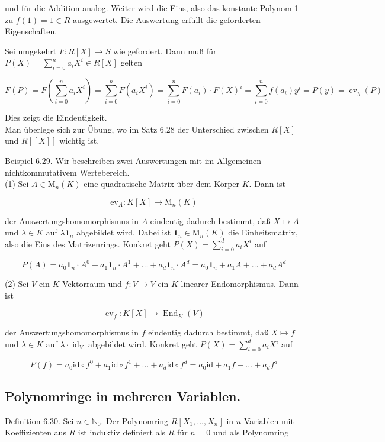\documentclass[10pt, letterpaper]{article}
\begin{document}
und für die Addition analog. Weiter wird die Eins, also das konstante Polynom 1 zu $f(1)=1 \in R$ ausgewertet. Die Auswertung erfüllt die geforderten Eigenschaften.

Sei umgekehrt $F: R[X] \rightarrow S$ wie gefordert. Dann muß für $P(X)=\sum_{i=0}^{n} a_{i} X^{i} \in R[X]$ gelten

$$
F(P)=F\left(\sum_{i=0}^{n} a_{i} X^{i}\right)=\sum_{i=0}^{n} F\left(a_{i} X^{i}\right)=\sum_{i=0}^{n} F\left(a_{i}\right) \cdot F(X)^{i}=\sum_{i=0}^{n} f\left(a_{i}\right) y^{i}=P(y)=\operatorname{ev}_{y}(P)
$$

Dies zeigt die Eindeutigkeit.\\
Man überlege sich zur Übung, wo im Satz 6.28 der Unterschied zwischen $R[X]$ und $R[[X]]$ wichtig ist.

Beispiel 6.29. Wir beschreiben zwei Auswertungen mit im Allgemeinen nichtkommutativem Wertebereich.\\
(1) Sei $A \in \mathrm{M}_{n}(K)$ eine quadratische Matrix über dem Körper $K$. Dann ist

$$
\mathrm{ev}_{A}: K[X] \rightarrow \mathrm{M}_{n}(K)
$$

der Auswertungshomomorphismus in $A$ eindeutig dadurch bestimmt, daß $X \mapsto A$ und $\lambda \in K$ auf $\lambda \mathbf{1}_{n}$ abgebildet wird. Dabei ist $\mathbf{1}_{n} \in \mathrm{M}_{n}(K)$ die Einheitsmatrix, also die Eins des Matrizenrings. Konkret geht $P(X)=\sum_{i=0}^{d} a_{i} X^{i}$ auf

$$
P(A)=a_{0} \mathbf{1}_{n} \cdot A^{0}+a_{1} \mathbf{1}_{n} \cdot A^{1}+\ldots+a_{d} \mathbf{1}_{n} \cdot A^{d}=a_{0} \mathbf{1}_{n}+a_{1} A+\ldots+a_{d} A^{d}
$$

(2) Sei $V$ ein $K$-Vektorraum und $f: V \rightarrow V$ ein $K$-linearer Endomorphismus. Dann ist

$$
\operatorname{ev}_{f}: K[X] \rightarrow \operatorname{End}_{K}(V)
$$

der Auswertungshomomorphismus in $f$ eindeutig dadurch bestimmt, daß $X \mapsto f$ und $\lambda \in K$ auf $\lambda \cdot \operatorname{id}_{V}$ abgebildet wird. Konkret geht $P(X)=\sum_{i=0}^{d} a_{i} X^{i}$ auf

$$
P(f)=a_{0} \mathrm{id} \circ f^{0}+a_{1} \mathrm{id} \circ f^{1}+\ldots+a_{d} \mathrm{id} \circ f^{d}=a_{0} \mathrm{id}+a_{1} f+\ldots+a_{d} f^{d}
$$

\subsection*{Polynomringe in mehreren Variablen.}
Definition 6.30. Sei $n \in \mathbb{N}_{0}$. Der Polynomring $R\left[X_{1}, \ldots, X_{n}\right]$ in $n$-Variablen mit Koeffizienten aus $R$ ist induktiv definiert als $R$ für $n=0$ und als Polynomring
\end{document}
